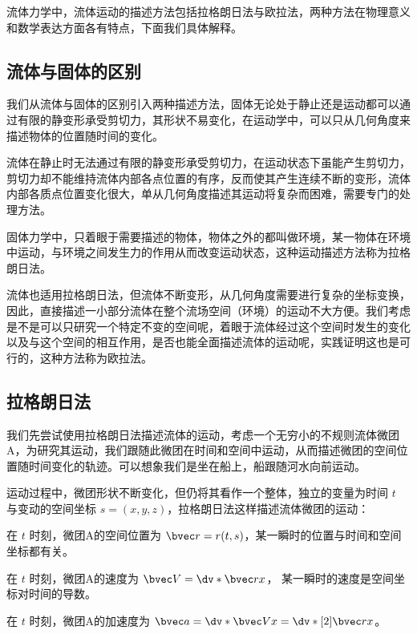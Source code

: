 
\begin{issues}
\issueDraft
\end{issues}

流体力学中，流体运动的描述方法包括拉格朗日法与欧拉法，两种方法在物理意义和数学表达方面各有特点，下面我们具体解释。

\subsection{流体与固体的区别}
我们从流体与固体的区别引入两种描述方法，固体无论处于静止还是运动都可以通过有限的静变形承受剪切力，其形状不易变化，在运动学中，可以只从几何角度来描述物体的位置随时间的变化。

流体在静止时无法通过有限的静变形承受剪切力，在运动状态下虽能产生剪切力，剪切力却不能维持流体内部各点位置的有序，反而使其产生连续不断的变形，流体内部各质点位置变化很大，单从几何角度描述其运动将复杂而困难，需要专门的处理方法。

固体力学中，只着眼于需要描述的物体，物体之外的都叫做环境，某一物体在环境中运动，与环境之间发生力的作用从而改变运动状态，这种运动描述方法称为拉格朗日法。

流体也适用拉格朗日法，但流体不断变形，从几何角度需要进行复杂的坐标变换，因此，直接描述一小部分流体在整个流场空间（环境）的运动不大方便。我们考虑是不是可以只研究一个特定不变的空间呢，着眼于流体经过这个空间时发生的变化以及与这个空间的相互作用，是否也能全面描述流体的运动呢，实践证明这也是可行的，这种方法称为欧拉法。

\subsection{拉格朗日法}
我们先尝试使用拉格朗日法描述流体的运动，考虑一个无穷小的不规则流体微团A，为研究其运动，我们跟随此微团在时间和空间中运动，从而描述微团的空间位置随时间变化的轨迹。可以想象我们是坐在船上，船跟随河水向前运动。

运动过程中，微团形状不断变化，但仍将其看作一个整体，独立的变量为时间 $t$ 与变动的空间坐标 $s=(x,y,z)$，拉格朗日法这样描述流体微团的运动：

在 $t$ 时刻，微团A的空间位置为 $\bvec r=r(t,s)$，某一瞬时的位置与时间和空间坐标都有关。

在 $t$ 时刻，微团A的速度为 $\bvec V=\dv*{\bvec r}{x}$，
某一瞬时的速度是空间坐标对时间的导数。

在 $t$ 时刻，微团A的加速度为 $\bvec a=\dv*{\bvec V}{x}=\dv*[2]{\bvec r}{x}$。

